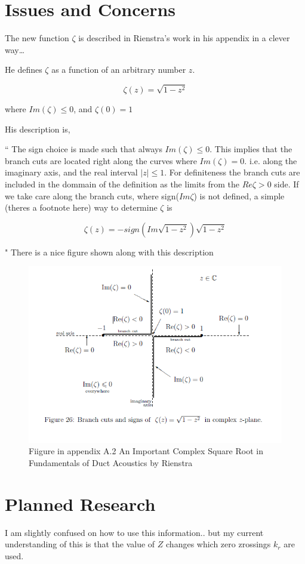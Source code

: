 \documentclass[a4paper]{article}
\begin{document}
\section{Issues and Concerns}
The new function $\zeta$ is described in Rienstra's work in his appendix in a clever way\dots


He defines $\zeta$ as a function of an arbitrary number $z$.

\[\zeta(z) = \sqrt{1 - z^2}\]

where $Im(\zeta) \leq 0$, and $\zeta(0) = 1$

His description is,

`` 
The sign choice is made such that always $Im(\zeta) \leq 0$. This implies that the branch cuts 
are located right along the curves where $Im(\zeta) = 0$. i.e. along the imaginary 
axis, and the real interval $|z| \leq 1$.
For definiteness the branch cuts are included in the dommain of the 
definition as the limits from the $Re \zeta > 0$ side. 
If we take care along the branch cuts, where sign($Im \zeta$) is not defined,
a simple (theres a footnote  here) way to determine $\zeta$ is 

\[ \zeta(z) = - sign (Im \sqrt{1 - z^2}) \sqrt{1 - z^2} \]

"
There is a nice figure shown along with this description 
\begin{figure}[!]
    \centering
    \includegraphics{Capture.PNG}
    \caption{Fiigure in appendix A.2 An Important Complex Square Root in 
    Fundamentals of Duct Acoustics by Rienstra}
\end{figure}
\section{Planned Research}

I am slightly confused on how to use this information.. but my current understanding 
of this is that the value of $Z$ changes which zero zrossings $k_r$ are used.
\end{document}
